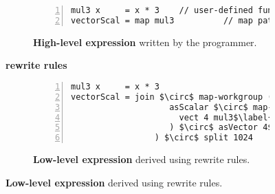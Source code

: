 \begin{figure}[t]
\centering

\begin{subfigure}[b]{.85\linewidth}
\begin{lstlisting}[mathescape,numbers=left]
mul3 x     = x * 3    // user-defined function
vectorScal = map mul3          // map pattern
\end{lstlisting}
\caption{\textbf{High-level expression} written by the programmer.}
\label{fig:codeex:map}
\end{subfigure}

\begin{minipage}{0.1\linewidth}
\vspace{0pt}
\centering
{}
\end{minipage}
\begin{minipage}{0.25\linewidth}
\vspace{-5pt}
\centering
\textbf{rewrite rules}
\end{minipage}
\begin{minipage}{0.1\linewidth}
\vspace{0pt}
\centering
{}
\end{minipage}

\begin{subfigure}[b]{\linewidth}
\centering
\begin{minipage}{.85\linewidth}%
\begin{lstlisting}[mathescape,numbers=left]
mul3 x     = x * 3
vectorScal = join $\circ$ map-workgroup ($\label{fig:codeex:impl:map-wg}$
                    asScalar $\circ$ map-local ($\label{fig:codeex:impl:map-wg:start}$
                      vect 4 mul3$\label{fig:codeex:impl:vec}$
                    ) $\circ$ asVector 4$\label{fig:codeex:impl:map-wg:stop}$$\label{fig:codeex:impl:asVec}$
                 ) $\circ$ split 1024
\end{lstlisting}
\end{minipage}
\caption{\textbf{Low-level expression} derived using rewrite rules.}
\label{fig:codeex:impl}
\end{subfigure}


\end{figure}
